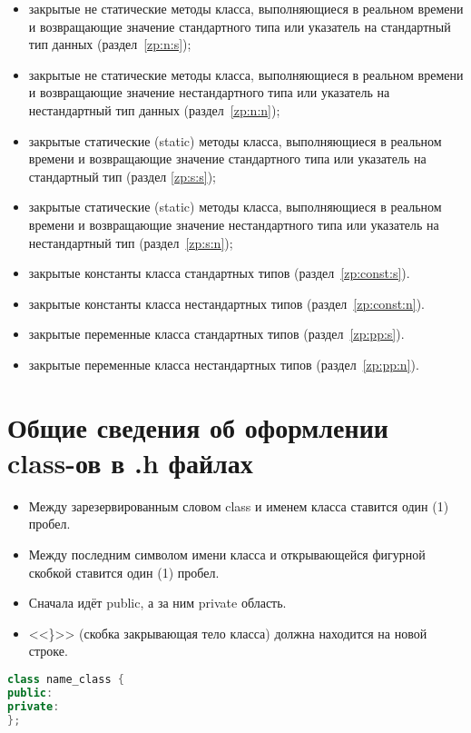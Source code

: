 \begin{enumerate}
\begin{itemize}
		\item закрытые не статические методы класса, выполняющиеся в реальном времени и возвращающие значение стандартного типа или указатель на стандартный тип данных (раздел~\ref{zp:n:s});
		\item закрытые не статические методы класса, выполняющиеся в реальном времени и возвращающие значение нестандартного типа или указатель на нестандартный тип данных (раздел~\ref{zp:n:n});
		\item закрытые статические (static) методы класса, выполняющиеся в реальном времени и возвращающие значение стандартного типа или указатель на стандартный тип (раздел \ref{zp:s:s});
		\item закрытые статические (static) методы класса, выполняющиеся в реальном времени и возвращающие значение нестандартного типа или указатель на нестандартный тип (раздел~\ref{zp:s:n});
		\item закрытые константы класса стандартных типов (раздел~\ref{zp:const:s}).
		\item закрытые константы класса нестандартных типов (раздел~\ref{zp:const:n}).
		\item закрытые переменные класса стандартных типов (раздел~\ref{zp:pp:s}).
		\item закрытые переменные класса нестандартных типов (раздел~\ref{zp:pp:n}).
	\end{itemize}
\end{enumerate}

\section{Общие сведения об оформлении class-ов в .h файлах}\label{OBK}
\begin{itemize}
	\item Между зарезервированным словом class и именем класса ставится один (1) пробел.
	\item Между последним символом имени класса и открывающейся фигурной скобкой ставится один (1) пробел.
	\item Сначала идёт public, а за ним private область.
	\item <<\}>> (скобка закрывающая тело класса) должна находится на новой строке.
\end{itemize}\begin{lstlisting}[language=C++, frame=tlBR, basicstyle=\fontsize{10}{10}\ttfamily]
class name_class {
public:
private:
};\end{lstlisting}


